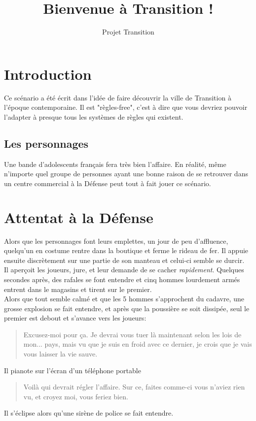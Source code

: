 \documentclass[10pt,a4paper,twocolumn]{article}
\author{Projet Transition}
\title{Bienvenue à Transition !}
\begin{document}
\maketitle
\section{Introduction}
Ce scénario a été écrit dans l'idée de faire découvrir la ville de Transition à l'époque contemporaine. Il est "règles-free", c'est à dire que vous devriez pouvoir l'adapter à presque tous les systèmes de règles qui existent.
\subsection{Les personnages}
Une bande d'adolescents français fera très bien l'affaire. En réalité, même n'importe quel groupe de personnes ayant une bonne raison de se retrouver dans un centre commercial à la Défense peut tout à fait jouer ce scénario.

\section{Attentat à la Défense}
Alors que les personnages font leurs emplettes, un jour de peu d'affluence, quelqu'un en costume rentre dans la boutique et ferme le rideau de fer. Il appuie ensuite discrètement sur une partie de son manteau et celui-ci semble se durcir.\\
Il aperçoit les joueurs, jure, et leur demande de se cacher \emph{rapidement}. Quelques secondes après, des rafales se font entendre et cinq hommes lourdement armés entrent dans le magasins et tirent sur le premier.\\
Alors que tout semble calmé et que les 5 hommes s'approchent du cadavre, une grosse explosion se fait entendre, et après que la poussière se soit dissipée, seul le premier est debout et s'avance vers les joueurs:
\begin{quote}
Excusez-moi pour ça. Je devrai vous tuer là maintenant selon les lois de mon... pays, mais vu que je suis en froid avec ce dernier, je crois que je vais vous laisser la vie sauve.
\end{quote}
Il pianote sur l'écran d'un téléphone portable %
\begin{quote}
Voilà qui devrait régler l'affaire. Sur ce, faites comme-ci vous n'aviez rien vu, et croyez moi, vous feriez bien.
\end{quote}
Il s'éclipse alors qu'une sirène de police se fait entendre.
\end{document}
